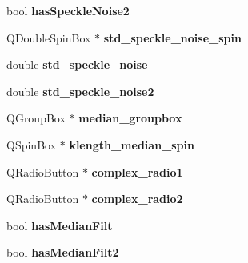 \begin{DoxyCompactItemize}
\item 
\hypertarget{classofeli_1_1_image_viewer_a6f3b2ff76d8e993103f688b97c5d3656}{bool {\bfseries has\-Speckle\-Noise2}}\label{classofeli_1_1_image_viewer_a6f3b2ff76d8e993103f688b97c5d3656}

\item 
\hypertarget{classofeli_1_1_image_viewer_ae91a35cd47ea36c56c3b518568906764}{Q\-Double\-Spin\-Box $\ast$ {\bfseries std\-\_\-speckle\-\_\-noise\-\_\-spin}}\label{classofeli_1_1_image_viewer_ae91a35cd47ea36c56c3b518568906764}

\item 
\hypertarget{classofeli_1_1_image_viewer_ae187aa2c90e70070e1685ffa9f6b55c4}{double {\bfseries std\-\_\-speckle\-\_\-noise}}\label{classofeli_1_1_image_viewer_ae187aa2c90e70070e1685ffa9f6b55c4}

\item 
\hypertarget{classofeli_1_1_image_viewer_a18403b8ee67ad749bf9405e5dc597105}{double {\bfseries std\-\_\-speckle\-\_\-noise2}}\label{classofeli_1_1_image_viewer_a18403b8ee67ad749bf9405e5dc597105}

\item 
\hypertarget{classofeli_1_1_image_viewer_a79ef1878cfbafb1eda2acf82eb0dc41f}{Q\-Group\-Box $\ast$ {\bfseries median\-\_\-groupbox}}\label{classofeli_1_1_image_viewer_a79ef1878cfbafb1eda2acf82eb0dc41f}

\item 
\hypertarget{classofeli_1_1_image_viewer_abe17d0f483722b171bf8c4f10fa2acdd}{Q\-Spin\-Box $\ast$ {\bfseries klength\-\_\-median\-\_\-spin}}\label{classofeli_1_1_image_viewer_abe17d0f483722b171bf8c4f10fa2acdd}

\item 
\hypertarget{classofeli_1_1_image_viewer_a4bcc6eb86df2a45ddfbae0b6d4a014fe}{Q\-Radio\-Button $\ast$ {\bfseries complex\-\_\-radio1}}\label{classofeli_1_1_image_viewer_a4bcc6eb86df2a45ddfbae0b6d4a014fe}

\item 
\hypertarget{classofeli_1_1_image_viewer_a5db7e85c426884a243a7817071058a9e}{Q\-Radio\-Button $\ast$ {\bfseries complex\-\_\-radio2}}\label{classofeli_1_1_image_viewer_a5db7e85c426884a243a7817071058a9e}

\item 
\hypertarget{classofeli_1_1_image_viewer_a2f74c916ea155a84804197a5080e454d}{bool {\bfseries has\-Median\-Filt}}\label{classofeli_1_1_image_viewer_a2f74c916ea155a84804197a5080e454d}

\item 
\hypertarget{classofeli_1_1_image_viewer_a1849d883561b1d8993f68c502a1a4528}{bool {\bfseries has\-Median\-Filt2}}\label{classofeli_1_1_image_viewer_a1849d883561b1d8993f68c502a1a4528}


\end{DoxyCompactItemize}
